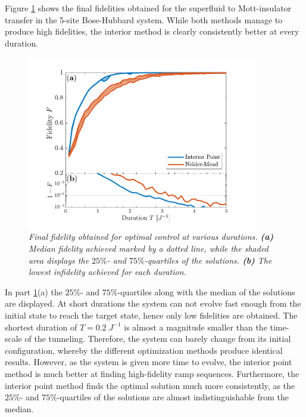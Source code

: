 Figure \ref{fig:FidelityDuration} shows the final fidelities obtained for the superfluid to Mott-insulator transfer in the 5-site Bose-Hubbard system. While both methods manage to produce high fidelities, the interior method is clearly consistently better at every duration.
\begin{figure}[h!]
    \centering
    \includegraphics[width=0.9\textwidth]{Figures/L5/FidelityDuration.pdf}
    \caption{\textit{Final fidelity obtained for optimal control at various durations. \textbf{(a)} Median fidelity achieved marked by a dotted line, while the shaded area displays the $25\%$- and $75\%$-quartiles of the solutions. \textbf{(b)} The lowest infidelity achieved for each duration. }}
    \label{fig:FidelityDuration}
\end{figure}
In part \ref{fig:FidelityDuration}(a) the $25\%$- and $75\%$-quartiles along with the median of the solutions are displayed. At short durations the system can not evolve fast enough from the initial state to reach the target state, hence only low fidelities are obtained. The shortest duration of $T = 0.2 \; J^{-1}$ is almost a magnitude smaller than the time-scale of the tunneling. Therefore, the system can barely change from its initial configuration, whereby the different optimization methods produce identical results. However, as the system is given more time to evolve, the interior point method is much better at finding high-fidelity ramp sequences. Furthermore, the interior point method finds the optimal solution much more consistently, as the $25\%$- and $75\%$-quartiles of the solutions are almost indistinguishable from the median.

